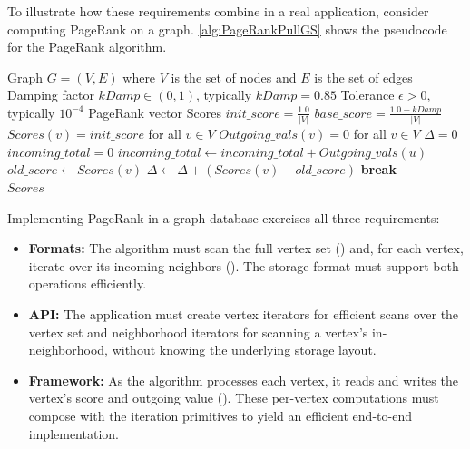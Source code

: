 To illustrate how these requirements combine in a real application, consider computing PageRank on a graph.
\autoref{alg:PageRankPullGS} shows the pseudocode for the PageRank algorithm.
\begin{algorithm}
  \begin{algorithmic}[1]
  \Require Graph $G = (V,E)$ where $V$ is the set of nodes and $E$ is the set of edges
  \Require Damping factor $kDamp \in (0, 1)$, typically $kDamp = 0.85$
  \Require Tolerance $\epsilon > 0$, typically $10^{-4}$
  \Ensure PageRank vector Scores
  \State $init\_score = \frac{1.0}{|V|}$
  \State $base\_score = \frac{1.0 - kDamp}{|V|}$
  \State $Scores(v) = init\_score$ for all $v \in V$
  \State $Outgoing\_vals(v) = 0$ for all $v \in V$
      \State {}
  \EndFor
      \State $\Delta = 0$
          \State $incoming\_total = 0$
              \State $incoming\_total \gets incoming\_total + Outgoing\_vals(u)$
          \EndFor
          \State $old\_score \gets Scores(v)$
          \State {}
          \State $\Delta \gets \Delta + (Scores(v) - old\_score)$
          \State {}
      \EndFor
      \If{$\Delta < \epsilon$}
          \State \textbf{break}
      \EndIf
  \EndFor \\
  \Return $Scores$
  \end{algorithmic}
  \caption{PageRank Algorithm as specified in the GAP Benchmark~\cite{beamer2015gap}: this variant allows new values to be immediately visible (Gauss--Seidel style~\cite{den2010pagerank}). The highlighted lines indicate different access patterns: , , and access to . For a vertex $v$, $N^+(v)$ denotes its out-neighborhood, and $N^-(v)$ its in-neighborhood.}
  \label{alg:PageRankPullGS}
  \end{algorithm}

Implementing PageRank in a graph database exercises all three requirements:
\begin{itemize}
\item \textbf{Formats:} The algorithm must scan the full vertex set () and, for each vertex, iterate over its incoming neighbors (). The storage format must support both operations efficiently.
\item \textbf{API:} The application must create vertex iterators for efficient scans over the vertex set and neighborhood iterators for scanning a vertex's in-neighborhood, without knowing the underlying storage layout.
\item \textbf{Framework:} As the algorithm processes each vertex, it reads and writes the vertex's score and outgoing value (). These per-vertex computations must compose with the iteration primitives to yield an efficient end-to-end implementation.
\end{itemize}

